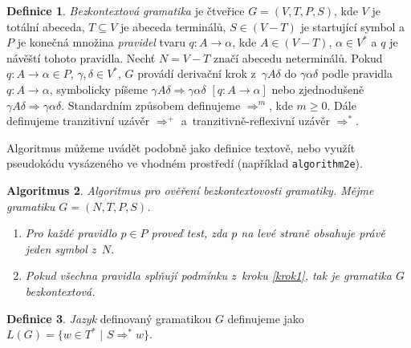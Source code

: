 \documentclass[a4paper,11pt,twocolumn]{article}
\theoremstyle{definition}
\newtheorem{definice}{Definice}[section]
\theoremstyle{plain}
\theoremstyle{definition}
\newtheorem{algoritmus}[definice]{Algoritmus}
\begin{document}
\begin{definice}\label{definice1_1}
\emph{Bezkontextová gramatika} je čtveřice $G = (V,T,P,S)$, kde $V$ je totální abeceda,
$T \subseteq V$ je abeceda terminálů, $S \in (V - T)$ je startující symbol a
$P$ je konečná množina \emph{pravidel} tvaru $q\colon A \rightarrow \alpha$, kde $A \in (V - T)$, $\alpha \in V^*$ a $q$ je návěští tohoto pravidla.
 Nechť $N = V - T$ značí abecedu neterminálů. Pokud $q\colon A \rightarrow \alpha \in P$, $\gamma$,\,$\delta \in V^*$, $G$ provádí derivační krok z~$\gamma{A}\delta$ do $\gamma\alpha\delta$ podle pravidla $q\colon A \rightarrow \alpha$, symbolicky píšeme $\gamma{A}\delta \Rightarrow \gamma\alpha\delta\,\,[q\colon A \rightarrow \alpha]$ nebo zjednodušeně $\gamma{A}\delta \Rightarrow \gamma\alpha\delta$.
Standardním způsobem definujeme $\Rightarrow^m$, kde $m \geq 0$. Dále definujeme tranzitivní uzávěr $\Rightarrow^+$ a~tranzitivně-reflexivní uzávěr $\Rightarrow^*$. 

\end{definice}
\par
Algoritmus můžeme uvádět podobně jako definice textově, nebo využít pseudokódu vysázeného ve vhodném prostředí (například  \texttt{algorithm2e}).
\par

\begin{algoritmus}
\emph{Algoritmus pro ověření bezkontextovosti gramatiky. Mějme gramatiku $G = (N, T, P, S)$.}
\begin{enumerate}[font=\itshape] %
  \item \label{krok1}\emph{Pro každé pravidlo $p \in P$ proveď test, zda $p$ na levé straně obsahuje právě jeden symbol z~$N$.}
  \item \emph{Pokud všechna pravidla splňují podmínku z~kro\-ku \ref{krok1}, tak je gramatika $G$ bezkontextová.}
\end{enumerate}
\end{algoritmus}
\par
\begin{definice}
  \emph{Jazyk} definovaný gramatikou $G$ definujeme jako $L(G) = \{w \in T^*\,\,|\,\,S \Rightarrow^* w\}$.
\end{definice}
\par
\end{document}
